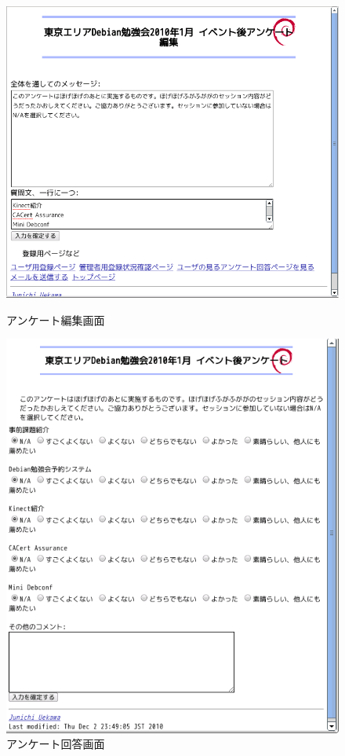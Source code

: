 \documentclass[mingoth,a4paper]{jsarticle}
\begin{document}
\begin{figure}[t]

\begin{minipage}{0.4\hsize}
 \begin{center}
  \includegraphics[width=1\hsize]{image201101/enquete-edit.png}
  \caption{アンケート編集画面} 
 \end{center}
\end{minipage}
\begin{minipage}{0.5\hsize}
 \begin{center}
  \includegraphics[width=1\hsize]{image201101/enquete-respond.png}
  \caption{アンケート回答画面}
 \end{center}
\end{minipage}
\end{figure}
\end{document}

